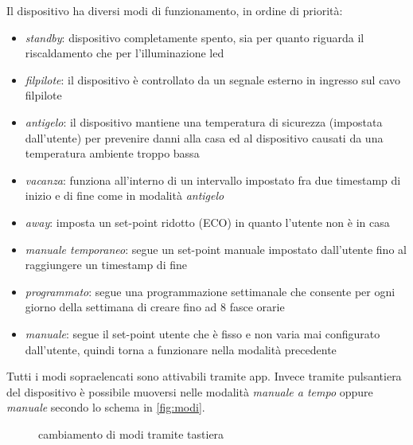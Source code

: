 \documentclass[12pt,a4paper,twoside,titlepage]{book}
\begin{document}
Il dispositivo ha diversi modi di funzionamento, in ordine di priorità:
\begin{itemize}
    \item \textit{standby}: dispositivo completamente spento, sia per quanto riguarda il riscaldamento
    che per l'illuminazione \acrshort{led}
    \item \textit{\gls{filpilote}}: il dispositivo è controllato da un segnale
        esterno in ingresso sul cavo \Gls{filpilote}
    \item \textit{antigelo}: il dispositivo mantiene una temperatura di sicurezza (impostata dall'utente)
        per prevenire danni alla casa ed al dispositivo causati da una temperatura ambiente troppo bassa
    \item \textit{vacanza}: funziona all'interno di un intervallo impostato fra due timestamp di inizio e di 
        fine come in modalità \textit{antigelo}
    \item \textit{away}: imposta un set-point ridotto (ECO) in quanto l'utente non è in casa
    \item \textit{manuale temporaneo}: segue un set-point manuale impostato dall'utente fino al raggiungere 
        un timestamp di fine
    \item \textit{programmato}: segue una programmazione settimanale che consente per ogni
        giorno della settimana di creare fino ad 8 fasce orarie
    \item \textit{manuale}: segue il set-point utente che è fisso e non varia mai
        configurato dall'utente, quindi torna a funzionare nella modalità precedente
\end{itemize}

Tutti i modi sopraelencati sono attivabili tramite app. Invece tramite pulsantiera del dispositivo è possibile 
muoversi nelle modalità \textit{manuale a tempo} oppure \textit{manuale} secondo lo schema in \autoref{fig:modi}.

\begin{figure}[ht]
    \centering
    \caption{cambiamento di modi tramite tastiera}
    \label{fig:modi}
\end{figure}
\end{document}
